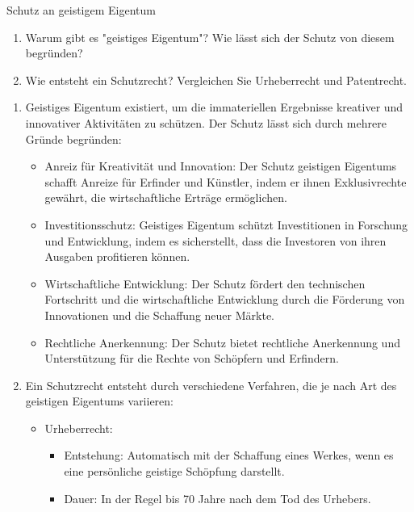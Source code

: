 \documentclass{article}
\begin{document}
\begin{exercise}{Schutz an geistigem Eigentum}
  \begin{enumerate}
    \item Warum gibt es "geistiges Eigentum"? Wie lässt sich der Schutz von diesem begründen?
    \item Wie entsteht ein Schutzrecht? Vergleichen Sie Urheberrecht und Patentrecht.
  \end{enumerate}

  \begin{solution}
    \begin{enumerate}
      \item Geistiges Eigentum existiert, um die immateriellen Ergebnisse kreativer und innovativer Aktivitäten zu schützen. Der Schutz lässt sich durch mehrere Gründe begründen:
            \begin{itemize}
              \item Anreiz für Kreativität und Innovation: Der Schutz geistigen Eigentums schafft Anreize für Erfinder und Künstler, indem er ihnen Exklusivrechte gewährt, die wirtschaftliche Erträge ermöglichen.
              \item Investitionsschutz: Geistiges Eigentum schützt Investitionen in Forschung und Entwicklung, indem es sicherstellt, dass die Investoren von ihren Ausgaben profitieren können.
              \item Wirtschaftliche Entwicklung: Der Schutz fördert den technischen Fortschritt und die wirtschaftliche Entwicklung durch die Förderung von Innovationen und die Schaffung neuer Märkte.
              \item Rechtliche Anerkennung: Der Schutz bietet rechtliche Anerkennung und Unterstützung für die Rechte von Schöpfern und Erfindern.
            \end{itemize}
      \item Ein Schutzrecht entsteht durch verschiedene Verfahren, die je nach Art des geistigen Eigentums variieren:
            \begin{itemize}
              \item Urheberrecht:
                    \begin{itemize}
                      \item Entstehung: Automatisch mit der Schaffung eines Werkes, wenn es eine persönliche geistige Schöpfung darstellt.
                      \item Dauer: In der Regel bis 70 Jahre nach dem Tod des Urhebers.

\end{itemize}
\end{itemize}
\end{enumerate}
\end{solution}
\end{exercise}
\end{document}
